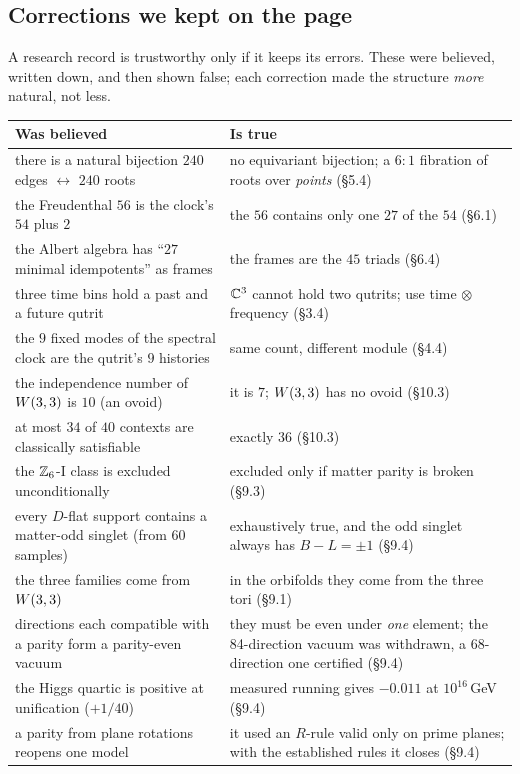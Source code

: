 \subsection{Corrections we kept on the page}

A research record is trustworthy only if it keeps its errors. These were believed,
written down, and then shown false; each correction made the structure \emph{more}
natural, not less.

\begin{center}
\small
\renewcommand{\arraystretch}{1.22}
\begin{tabularx}{\textwidth}{@{}Xp{6.2cm}@{}}
\toprule
\textbf{Was believed} & \textbf{Is true} \\
\midrule
there is a natural bijection $240$ edges $\leftrightarrow$ $240$ roots & no equivariant bijection; a $6{:}1$ fibration of roots over \emph{points} (\S5.4)\\
the Freudenthal $56$ is the clock's $54$ plus $2$ & the $56$ contains only one $27$ of the $54$ (\S6.1)\\
the Albert algebra has ``$27$ minimal idempotents'' as frames & the frames are the $45$ triads (\S6.4)\\
three time bins hold a past and a future qutrit & $\mathbb{C}^3$ cannot hold two qutrits; use time $\otimes$ frequency (\S3.4)\\
the $9$ fixed modes of the spectral clock are the qutrit's $9$ histories & same count, different module (\S4.4)\\
the independence number of $W(3,3)$ is $10$ (an ovoid) & it is $7$; $W(3,3)$ has no ovoid (\S10.3)\\
at most $34$ of $40$ contexts are classically satisfiable & exactly $36$ (\S10.3)\\
the $\mathbb{Z}_6$-I class is excluded unconditionally & excluded only if matter parity is broken (\S9.3)\\
every $D$-flat support contains a matter-odd singlet (from $60$ samples) & exhaustively true, and the odd singlet always has $B-L=\pm1$ (\S9.4)\\
the three families come from $W(3,3)$ & in the orbifolds they come from the three tori (\S9.1)\\
directions each compatible with a parity form a parity-even vacuum & they must be even under \emph{one} element; the 84-direction vacuum was withdrawn, a 68-direction one certified (\S9.4)\\
the Higgs quartic is positive at unification ($+1/40$) & measured running gives $-0.011$ at $10^{16}$\,GeV (\S9.4)\\
a parity from plane rotations reopens one model & it used an $R$-rule valid only on prime planes; with the established rules it closes (\S9.4)\\
\bottomrule
\end{tabularx}
\end{center}

